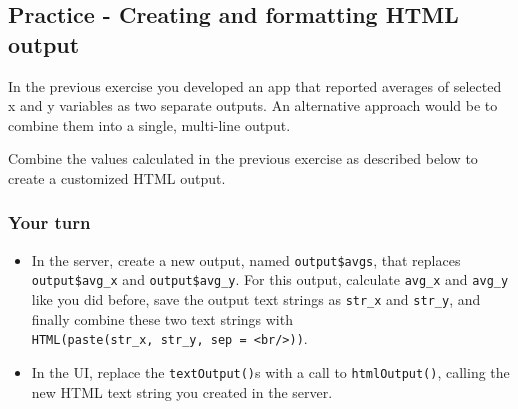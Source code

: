 \documentclass[
  letterpaper,
  DIV=11,
  numbers=noendperiod]{scrreprt}
\newenvironment{Shaded}{\begin{snugshade}}{\end{snugshade}}
\newcommand{\AttributeTok}[1]{\textcolor[rgb]{0.40,0.46,0.14}{#1}}
\newcommand{\CommentTok}[1]{\textcolor[rgb]{0.37,0.37,0.37}{#1}}
\newcommand{\ConstantTok}[1]{\textcolor[rgb]{0.56,0.35,0.01}{#1}}
\newcommand{\DecValTok}[1]{\textcolor[rgb]{0.68,0.00,0.00}{#1}}
\newcommand{\FunctionTok}[1]{\textcolor[rgb]{0.28,0.35,0.67}{#1}}
\newcommand{\NormalTok}[1]{\textcolor[rgb]{0.00,0.46,0.62}{#1}}
\newcommand{\OtherTok}[1]{\textcolor[rgb]{0.00,0.46,0.62}{#1}}
\newcommand{\SpecialCharTok}[1]{\textcolor[rgb]{0.37,0.37,0.37}{#1}}
\providecommand{\tightlist}{%
  \setlength{\itemsep}{0pt}\setlength{\parskip}{0pt}}
\begin{document}
\begin{Shaded}
\end{Shaded}

\hypertarget{practice---creating-and-formatting-html-output}{%
\subsection{Practice - Creating and formatting HTML
output}\label{practice---creating-and-formatting-html-output}}

In the previous exercise you developed an app that reported averages of
selected x and y variables as two separate outputs. An alternative
approach would be to combine them into a single, multi-line output.

Combine the values calculated in the previous exercise as described
below to create a customized HTML output.

\hypertarget{your-turn-18}{%
\subsubsection{Your turn}\label{your-turn-18}}

\begin{itemize}
\tightlist
\item
  In the server, create a new output, named \texttt{output\$avgs}, that
  replaces \texttt{output\$avg\_x} and \texttt{output\$avg\_y}. For this
  output, calculate \texttt{avg\_x} and \texttt{avg\_y} like you did
  before, save the output text strings as \texttt{str\_x} and
  \texttt{str\_y}, and finally combine these two text strings with
  \texttt{HTML(paste(str\_x,\ str\_y,\ sep\ =\ \textquotesingle{}\textless{}br/\textgreater{}\textquotesingle{}))}.
\item
  In the UI, replace the \texttt{textOutput()}s with a call to
  \texttt{htmlOutput()}, calling the new HTML text string you created in
  the server.
\end{itemize}
\end{document}
